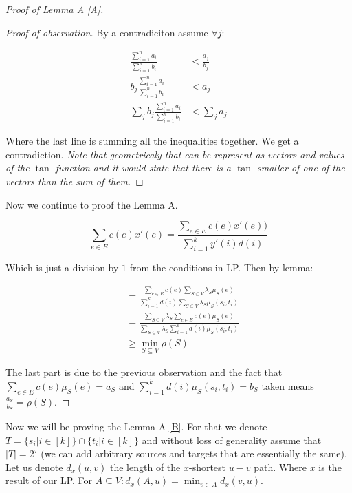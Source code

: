 \begin{proof}[Proof of Lemma A \ref{A}]
	\begin{proof}[Proof of observation]
		By a contradiciton assume $\forall j:$
		
		$$
		\begin{aligned}
			\frac{\sum_{i = 1}^{n} a_{i}}{\sum_{i = 1}^{n} b_{i}} &< \frac{a_{j}}{b_{j}}\\
			b_{j} \frac{\sum_{i = 1}^{n} a_{i}}{\sum_{i = 1}^{n} b_{i}} &< a_{j}\\
			\sum_{j} b_{j} \frac{\sum_{i = 1}^{n} a_{i}}{\sum_{i = 1}^{n} b_{i}} &< \sum_{j} a_{j}
		\end{aligned}
		$$
		
		Where the last line is summing all the inequalities together. We get a contradiction. \textit{Note that geometricaly that can be represent as vectors and values of the $\tan$ function and it would state that there is a $\tan$ smaller of one of the vectors than the sum of them.}
	\end{proof}
	
	Now we continue to proof the Lemma A.
	
	$$
	\sum_{e \in E} c(e) x'(e) = \frac{\sum_{e \in E}c(e) x'(e))}{\sum_{i = 1}^{k}y'(i) d(i)}
	$$
	
	Which is just a division by $1$ from the conditions in LP. Then by lemma:
	
	$$
	\begin{aligned}
		& = \frac{\sum_{e \in E} c(e) \sum_{S \subseteq V} \lambda_{S} \mu_{S}(e)}{\sum_{i =1}^{k} d(i) \sum_{S \subseteq V} \lambda_{S} \mu_{S}(s_{i},t_{i})}\\
		&= \frac{\sum_{S \subseteq V} \lambda_{S} \sum_{e \in E} c(e) \mu_{S}(e)}{\sum_{S \subseteq V} \lambda_{S} \sum_{i =1}^{k} d(i)  \mu_{S}(s_{i},t_{i})}\\
		&\geq \min_{S \subseteq V} \rho(S)
	\end{aligned}
	$$
	
	The last part is due to the previous observation and the fact that $\sum_{e \in E} c(e) \mu_{S}(e) = a_{S}$ and $\sum_{i =1}^{k} d(i)  \mu_{S}(s_{i},t_{i}) = b_{S}$ taken means $\frac{a_{S}}{b_{S}} = \rho(S)$.
\end{proof}

Now we will be proving the Lemma A \ref{B}. For that we denote $T = \{s_{i} | i \in [k]\} \cap \{t_{i}| i \in [k]\}$ and without loss of generality assume that $|T| = 2^{\tau}$ (we can add arbitrary sources and targets that are essentially the same). Let us denote $d_{x} (u,v)$ the length of the $x$-shortest $u-v$ path. Where $x$ is the result of our LP. For $A \subseteq V: d_{x}(A,u) = \min_{v \in A} d_{x}(v,u)$.

